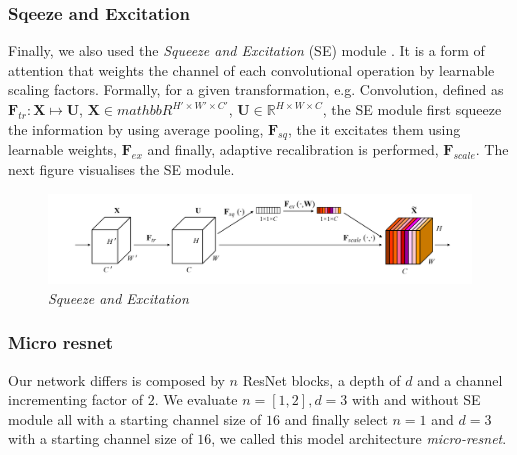 \documentclass[../document.tex]{subfiles}
\begin{document}
\subsubsection{Sqeeze and Excitation}
Finally, we also used the \emph{Squeeze and Excitation} (SE) module \cite{hu2017squeeze}. It is a form of attention that weights the channel of each convolutional operation by learnable scaling factors. Formally, for a given transformation, e.g. Convolution, defined as $\bm{F}_{tr}  : \bm{X} \mapsto \bm{U}$, $\bm{X} \in mathbb{R}^{H' \times W' \times C'}$, $\bm{U} \in \mathbb{R}^{H \times W \times C}$, the SE module first squeeze the information by using average pooling, $\bm{F}_{sq}$, the it excitates them using learnable weights, $\bm{F}_{ex}$ and finally, adaptive recalibration is performed, $\bm{F}_{scale}$.
The next figure visualises the SE module.
\begin{figure}[H]
    \centering
    \includegraphics[width=\linewidth]{../img/implementation/estimator/se.png}
    \caption{\emph{Squeeze and Excitation} \cite{hu2017squeeze}}
\end{figure}
\subsubsection{Micro resnet}
Our network differs is composed by $n$ ResNet blocks, a depth of $d$ and a channel incrementing factor of $2$. We evaluate $n=[1,2], d=3$ with and without SE module all with a starting channel size of $16$ and finally select $n=1$ and $d=3$ with a starting channel size of $16$, we called this model architecture \emph{micro-resnet}. 
\end{document}
